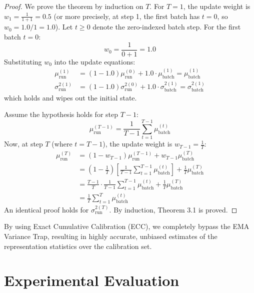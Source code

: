 \documentclass{article}
\theoremstyle{plain}
\theoremstyle{definition}
\theoremstyle{remark}
\begin{document}
\begin{proof}
We prove the theorem by induction on $T$.
For $T=1$, the update weight is $w_1 = \frac{1}{1+1} = 0.5$ (or more precisely, at step 1, the first batch has $t=0$, so $w_0 = 1.0 / 1 = 1.0$).
Let $t \ge 0$ denote the zero-indexed batch step. For the first batch $t=0$:
\begin{equation}
    w_0 = \frac{1}{0+1} = 1.0
\end{equation}
Substituting $w_0$ into the update equations:
\begin{align}
    \mu_{\text{run}}^{(1)} &= (1 - 1.0)\mu_{\text{run}}^{(0)} + 1.0 \cdot \mu_{\text{batch}}^{(1)} = \mu_{\text{batch}}^{(1)} \\
    \sigma^{2 (1)}_{\text{run}} &= (1 - 1.0)\sigma^{2 (0)}_{\text{run}} + 1.0 \cdot \sigma^{2 (1)}_{\text{batch}} = \sigma^{2 (1)}_{\text{batch}}
\end{align}
which holds and wipes out the initial state.

Assume the hypothesis holds for step $T-1$:
\begin{equation}
    \mu_{\text{run}}^{(T-1)} = \frac{1}{T-1} \sum_{t=1}^{T-1} \mu_{\text{batch}}^{(t)}
\end{equation}
Now, at step $T$ (where $t = T-1$), the update weight is $w_{T-1} = \frac{1}{T}$:
\begin{align}
    \mu_{\text{run}}^{(T)} &= (1 - w_{T-1}) \mu_{\text{run}}^{(T-1)} + w_{T-1} \mu_{\text{batch}}^{(T)} \nonumber \\
    &= \left(1 - \frac{1}{T}\right) \left[ \frac{1}{T-1} \sum_{t=1}^{T-1} \mu_{\text{batch}}^{(t)} \right] + \frac{1}{T} \mu_{\text{batch}}^{(T)} \nonumber \\
    &= \frac{T-1}{T} \cdot \frac{1}{T-1} \sum_{t=1}^{T-1} \mu_{\text{batch}}^{(t)} + \frac{1}{T} \mu_{\text{batch}}^{(T)} \nonumber \\
    &= \frac{1}{T} \sum_{t=1}^T \mu_{\text{batch}}^{(t)}
\end{align}
An identical proof holds for $\sigma^{2 (T)}_{\text{run}}$. By induction, Theorem 3.1 is proved.
\end{proof}

By using Exact Cumulative Calibration (ECC), we completely bypass the EMA Variance Trap, resulting in highly accurate, unbiased estimates of the representation statistics over the calibration set.

\section{Experimental Evaluation}
\label{sec:experiments}
\end{document}
